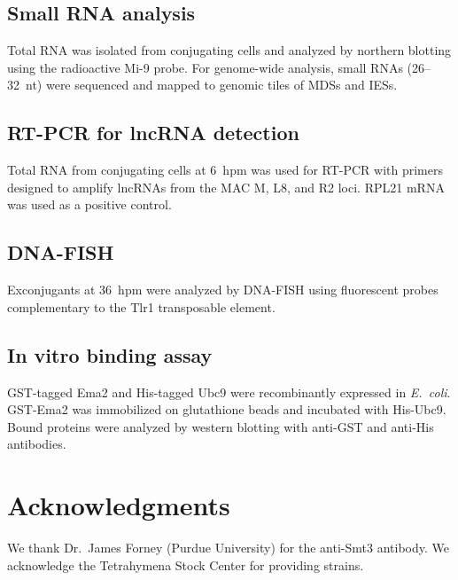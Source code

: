 \documentclass[11pt]{article}
\begin{document}
\subsection{Small RNA analysis}
Total RNA was isolated from conjugating cells and analyzed by northern blotting using the radioactive Mi-9 probe. For genome-wide analysis, small RNAs (26--32~nt) were sequenced and mapped to genomic tiles of MDSs and IESs.

\subsection{RT-PCR for lncRNA detection}
Total RNA from conjugating cells at 6~hpm was used for RT-PCR with primers designed to amplify lncRNAs from the MAC M, L8, and R2 loci. RPL21 mRNA was used as a positive control.

\subsection{DNA-FISH}
Exconjugants at 36~hpm were analyzed by DNA-FISH using fluorescent probes complementary to the Tlr1 transposable element.

\subsection{In vitro binding assay}
GST-tagged Ema2 and His-tagged Ubc9 were recombinantly expressed in \textit{E.\ coli}. GST-Ema2 was immobilized on glutathione beads and incubated with His-Ubc9. Bound proteins were analyzed by western blotting with anti-GST and anti-His antibodies.

\section*{Acknowledgments}
We thank Dr.\ James Forney (Purdue University) for the anti-Smt3 antibody. We acknowledge the Tetrahymena Stock Center for providing strains.


\end{document}
